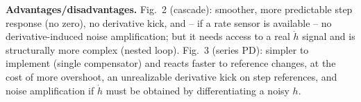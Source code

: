 \documentclass[11pt]{article}
\begin{document}
\noindent\textbf{Advantages/disadvantages.} Fig.\ 2 (cascade): smoother, more predictable step response (no zero), no derivative kick, and -- if a rate sensor is available -- no derivative-induced noise amplification; but it needs access to a real $\dot h$ signal and is structurally more complex (nested loop). Fig.\ 3 (series PD): simpler to implement (single compensator) and reacts faster to reference changes, at the cost of more overshoot, an unrealizable derivative kick on step references, and noise amplification if $\dot h$ must be obtained by differentiating a noisy $h$.
\end{document}
